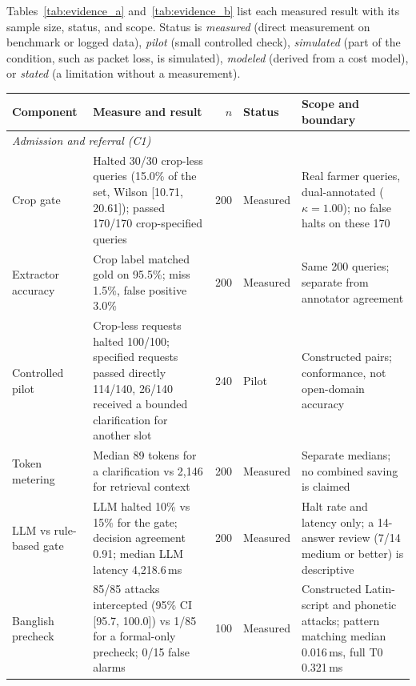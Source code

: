 \documentclass[11pt,a4paper]{article}
\begin{document}
Tables~\ref{tab:evidence_a} and~\ref{tab:evidence_b} list each measured result with its sample size, status, and scope. Status is \emph{measured} (direct measurement on benchmark or logged data), \emph{pilot} (small controlled check), \emph{simulated} (part of the condition, such as packet loss, is simulated), \emph{modeled} (derived from a cost model), or \emph{stated} (a limitation without a measurement).

\par\vspace{0.2em}
\noindent
\begin{minipage}{\textwidth}
\centering
\fontsize{6.2pt}{7.0pt}\selectfont
\renewcommand{\arraystretch}{0.65}
\setlength{\tabcolsep}{2.5pt}
\begin{tabularx}{\textwidth}{@{}p{} p{} r p{} X@{}}
\toprule
\textbf{Component} & \textbf{Measure and result} & \textbf{$n$} & \textbf{Status} & \textbf{Scope and boundary} \\
\midrule
\multicolumn{5}{l}{\textit{Admission and referral (C1)}} \\
Crop gate & Halted 30/30 crop-less queries (15.0\% of the set, Wilson [10.71, 20.61]); passed 170/170 crop-specified queries & 200 & Measured & Real farmer queries, dual-annotated ($\kappa = 1.00$); no false halts on these 170 \\
Extractor accuracy & Crop label matched gold on 95.5\%; miss 1.5\%, false positive 3.0\% & 200 & Measured & Same 200 queries; separate from annotator agreement \\
Controlled pilot & Crop-less requests halted 100/100; specified requests passed directly 114/140, 26/140 received a bounded clarification for another slot & 240 & Pilot & Constructed pairs; conformance, not open-domain accuracy \\
Token metering & Median 89 tokens for a clarification vs 2,146 for retrieval context & 200 & Measured & Separate medians; no combined saving is claimed \\
LLM vs rule-based gate & LLM halted 10\% vs 15\% for the gate; decision agreement 0.91; median LLM latency 4,218.6\,ms & 200 & Measured & Halt rate and latency only; a 14-answer review (7/14 medium or better) is descriptive \\
Banglish precheck & 85/85 attacks intercepted (95\% CI [95.7, 100.0]) vs 1/85 for a formal-only precheck; 0/15 false alarms & 100 & Measured & Constructed Latin-script and phonetic attacks; pattern matching median 0.016\,ms, full T0 0.321\,ms \\

\end{tabularx}
\end{minipage}
\end{document}
